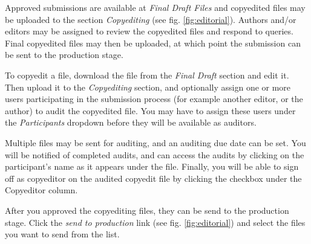 \newpage


Approved submissions are available at \textit{Final Draft Files} and copyedited files may be uploaded to the section \textit{Copyediting} (see fig. \ref{fig:editorial}). Authors and/or editors may be assigned to review the copyedited files and respond to queries. Final copyedited files may then be uploaded, at which point the submission can be sent to the production stage.

To copyedit a file, download the file from the \textit{Final Draft} section and edit it. Then upload it to the \textit{Copyediting} section, and optionally assign one or more users participating in the submission process (for example another editor, or the author) to audit the copyedited file. You may have to assign these users under the \textit{Participants} dropdown before they will be available as auditors.


Multiple files may be sent for auditing, and an auditing due date can be set. You will be notified of completed audits, and can access the audits by clicking on the participant's name as it appears under the file. Finally, you will be able to sign off as copyeditor on the audited copyedit file by clicking the checkbox under the Copyeditor column.

After you approved the copyediting files, they can be send to the production stage. Click the \textit{send to production} link (see fig. \ref{fig:editorial}) and select the files you want to send from the list.




